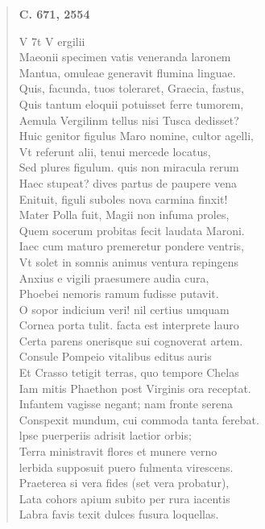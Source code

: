 \documentclass[11pt, a4paper]{report}
\begin{document}
\begin{verse}
    \begin{center} \textbf{C. 671, 2554} \end{center} \marginpar{[142]} V 7t V ergilii \\ Maeonii specimen vatis veneranda laronem \\ Mantua, omuleae generavit flumina linguae. \\ Quis, facunda, tuos toleraret, Graecia, fastus, \\ Quis tantum eloquii potuisset ferre tumorem, \\ Aemula Vergilinm tellus nisi Tusca dedisset? \\ Huic genitor figulus Maro nomine, cultor agelli, \\ Vt referunt alii, tenui mercede locatus, \\ Sed plures figulum. quis non miracula rerum \\ Haec stupeat? dives partus de paupere vena \\ Enituit, figuli suboles nova carmina finxit! \\ Mater Polla fuit, Magii non infuma proles, \\ Quem socerum probitas fecit laudata Maroni. \\ Iaec cum maturo premeretur pondere ventris, \\ Vt solet in somnis animus ventura repingens \\ Anxius e vigili praesumere audia cura, \\ Phoebei nemoris ramum fudisse putavit. \\ O sopor indicium veri! nil certius umquam \\ Cornea porta tulit. facta est interprete lauro \\ Certa parens onerisque sui cognoverat artem. \\ Consule Pompeio vitalibus editus auris \\ Et Crasso tetigit terras, quo tempore Chelas \\ Iam mitis Phaethon post Virginis ora receptat. \\ Infantem vagisse negant; nam fronte serena \\ Conspexit mundum, cui commoda tanta ferebat. \\ lpse puerperiis adrisit laetior orbis; \\ Terra ministravit flores et munere verno \\ lerbida supposuit puero fulmenta virescens. \\ Praeterea si vera fides (set vera probatur), \\ Lata cohors apium subito per rura iacentis \\ Labra favis texit dulces fusura loquellas. \\ 

\end{verse}
\end{document}
